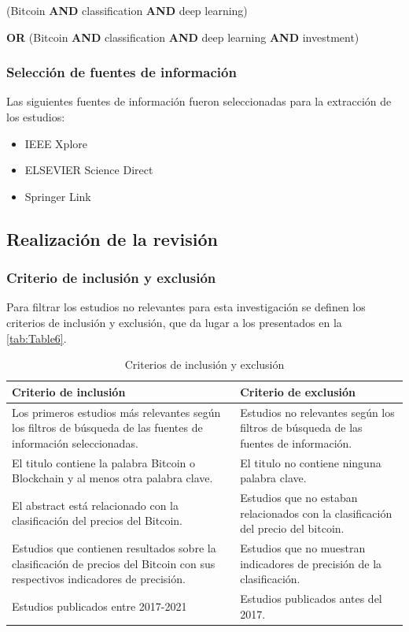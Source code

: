 \centerline{(Bitcoin \textbf{AND} classification \textbf{AND} deep learning)} 
\centerline{\textbf{OR} (Bitcoin \textbf{AND} classification \textbf{AND} deep learning \textbf{AND} investment)}

\subsubsection{Selección de fuentes de información}
Las siguientes fuentes de información fueron seleccionadas para la extracción de los estudios:\\
\begin{itemize}
	\item IEEE Xplore
	\item ELSEVIER Science Direct
	\item Springer Link\\
\end{itemize}
\subsection{Realización de la revisión}
\subsubsection{Criterio de inclusión y exclusión}
Para filtrar los estudios no relevantes para esta investigación se definen los criterios de inclusión y exclusión, que da lugar a los presentados en la \autoref{tab:Table6}.\\

\begin{table}[h!]
	\centering
	\begin{tabular}{ | m{7cm}| m{7cm} | }
		\hline
		\textbf{Criterio de inclusión} & \textbf{Criterio de exclusión}\\
		\hline
		Los primeros estudios más relevantes según los filtros de búsqueda de las fuentes de información seleccionadas.& Estudios no relevantes según los filtros de búsqueda de las fuentes de información.\\
		\hline
		El titulo contiene la palabra Bitcoin o Blockchain y al menos otra palabra clave.&  El titulo no contiene ninguna palabra clave.\\ 
		\hline
		El abstract está relacionado con la clasificación del precios del Bitcoin.& Estudios que no estaban relacionados con la clasificación del precio del bitcoin.\\
		\hline
		Estudios que contienen resultados sobre la clasificación de precios del Bitcoin con sus respectivos indicadores de precisión.& Estudios que no muestran indicadores de precisión de la clasificación.\\
		\hline
		Estudios publicados entre 2017-2021&Estudios publicados antes del 2017.\\
		\hline
	\end{tabular}
	\caption{Criterios de inclusión y exclusión}
	\label{tab:Table6}
\end{table}

